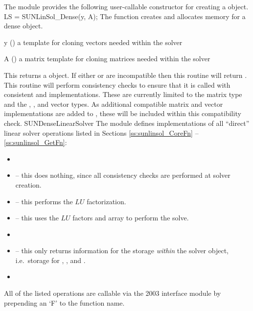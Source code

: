 The {\sunlinsoldense} module provides the following user-callable constructor
for creating a \newline {} object.
%
%
{
  LS = SUNLinSol\_Dense(y, A);
}
{
  The function  creates and allocates memory for
  a dense \newline {} object.
}
{
  \begin{args}[y]
  \item[y] ()
    a template for cloning vectors needed within the solver
  \item[A] ()
    a {\sunmatdense} matrix template for cloning matrices needed
    within the solver
  \end{args}
}
{
  This returns a  object.  If either  or
   are incompatible then this routine will return .
}
{
  This routine will perform consistency checks to ensure that it is
  called with consistent {\nvector} and {\sunmatrix} implementations.
  These are currently limited to the {\sunmatdense} matrix type and
  the {\nvecs}, {\nvecopenmp}, and {\nvecpthreads} vector types.  As
  additional compatible matrix and vector implementations are added to
  {\sundials}, these will be included within this compatibility check.
}
{SUNDenseLinearSolver}
%
%
The {\sunlinsoldense} module defines implementations of all
``direct'' linear solver operations listed in Sections
\ref{ss:sunlinsol_CoreFn} -- \ref{ss:sunlinsol_GetFn}:
\begin{itemize}
\item {}
\item {} -- this does nothing, since all
  consistency checks are performed at solver creation.
\item {} -- this performs the $LU$ factorization.
\item {} -- this uses the $LU$ factors
  and  array to perform the solve.
\item {}
\item {} -- this only returns information for
  the storage \emph{within} the solver object, i.e.~storage
  for , , and .
\item {}
\end{itemize}
All of the listed operations are callable via the {\F} 2003 interface module
by prepending an `F' to the function name.


